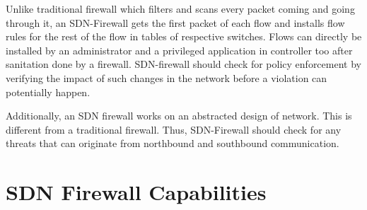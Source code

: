 Unlike traditional firewall which filters and scans every packet coming and going through it, an SDN-Firewall gets the first packet of each flow and installs flow rules for the rest of the flow in tables of respective switches. Flows can directly be installed by an administrator and a privileged application in controller too after sanitation done by a firewall. SDN-firewall should check for policy enforcement by verifying the impact of such changes in the network before a violation can potentially happen. 

Additionally, an SDN firewall works on an abstracted design of network. This is different from a traditional firewall. Thus, SDN-Firewall should check for any threats that can originate from northbound and southbound communication.

\section{SDN Firewall Capabilities}
